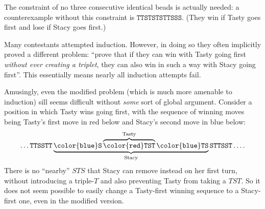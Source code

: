 \begin{remark*}
  The constraint of no three consecutive identical beads is actually
  needed: a counterexample without this constraint is
  $\mathtt{TTSTSTSTTSSS}$.
  (They win if Tasty goes first and lose if Stacy goes first.)
\end{remark*}

\begin{remark*}
  Many contestants attempted induction.
  However, in doing so they often implicitly proved
  a different problem: ``prove that if they can win
  with Tasty going first \emph{without ever creating a triplet},
  they can also win in such a way with Stacy going first''.
  This essentially means nearly all induction attempts fail.

  Amusingly, even the modified problem
  (which is much more amenable to induction)
  sill seems difficult without \emph{some} sort of global argument.
  Consider a position in which Tasty wins going first,
  with the sequence of winning moves being Tasty's first move in red
  below and Stacy's second move in blue below:
  \[
    \dots \mathtt{TTSSTT}
    \underbrace{\mathtt{\color{blue}S}
    \overbrace{\mathtt{\color{red}TST}}^{\text{Tasty}}
    \mathtt{\color{blue}TS}}_{\text{Stacy}}
    \mathtt{STTSST} \dots.
  \]
  There is no ``nearby'' $STS$ that Stacy can remove
  instead on her first turn,
  without introducing a triple-$T$ and also
  preventing Tasty from taking a $TST$.
  So it does not seem possible to easily change
  a Tasty-first winning sequence to a Stacy-first one,
  even in the modified version.
\end{remark*}
